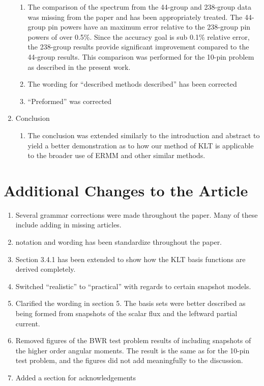 \documentclass[a4paper,10pt]{article}
\begin{document}
\begin{enumerate}
\begin{enumerate}
        \item The comparison of the spectrum from the 44-group and 238-group 
data was missing from the paper and has been appropriately treated.  The 
 44-group pin powers have an maximum error relative to the 238-group pin powers 
of over 0.5\%.  Since the accuracy goal is sub 0.1\% relative error, the 
238-group results provide significant improvement compared to the 44-group 
results.  This comparison was performed for the 10-pin problem as described in 
the present work.

        \item The wording for ``described methods described'' has been corrected
        
        \item ``Preformed'' was corrected
    \end{enumerate}
    
    \item Conclusion
    \begin{enumerate}
        \item The conclusion was extended similarly to the introduction and 
abstract to yield a better demonstration as to how our method of KLT is 
applicable to the broader use of ERMM and other similar methods.
    \end{enumerate}
\end{enumerate}

\section*{Additional Changes to the Article}

\begin{enumerate}
    \item Several grammar corrections were made throughout the paper.  Many of 
these include adding in missing articles.
    \item notation and wording has been standardize throughout the paper.
    \item Section 3.4.1 has been extended to show how the KLT basis functions 
are derived completely.
    \item Switched ``realistic'' to ``practical'' with regards to certain 
snapshot models.
    \item Clarified the wording in section 5.  The basis sets were better 
described as being formed from snapshots of the scalar flux and the leftward 
partial current.
    \item Removed figures of the BWR test problem results of including 
snapshots of the higher order angular moments.  The result is the same as for 
the 10-pin test problem, and the figures did not add meaningfully to the 
discussion.
    \item Added a section for acknowledgements
\end{enumerate}
\end{document}
